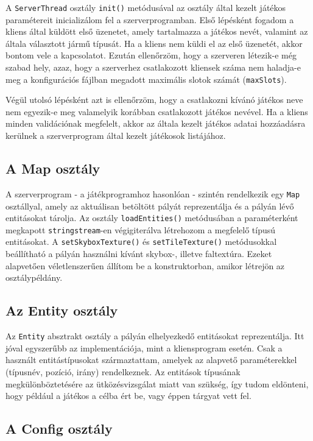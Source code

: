 A \verb|ServerThread| osztály \verb|init()| metódusával az osztály által kezelt játékos paramétereit inicializálom fel a szerverprogramban. Első lépésként fogadom a kliens által küldött első üzenetet, amely tartalmazza a játékos nevét, valamint az általa választott jármű típusát. Ha a kliens nem küldi el az első üzenetét, akkor bontom vele a kapcsolatot. Ezután ellenőrzöm, hogy a szerveren létezik-e még szabad hely, azaz, hogy a szerverhez csatlakozott kliensek száma nem haladja-e meg a konfigurációs fájlban megadott maximális slotok számát (\verb|maxSlots|).

Végül utolsó lépésként azt is ellenőrzöm, hogy a csatlakozni kívánó játékos neve nem egyezik-e meg valamelyik korábban csatlakozott játékos nevével. Ha a kliens minden validációnak megfelelt, akkor az általa kezelt játékos adatai hozzáadásra kerülnek a szerverprogram által kezelt játékosok listájához.

\subsection{A Map osztály}

A szerverprogram - a játékprogramhoz hasonlóan - szintén rendelkezik egy \verb|Map| osztállyal, amely az aktuálisan betöltött pályát reprezentálja és a pályán lévő entitásokat tárolja. Az osztály \verb|loadEntities()| metódusában a paraméterként megkapott \verb|stringstream|-en végigiterálva létrehozom a megfelelő típusú entitásokat. A \verb|setSkyboxTexture()| és \verb|setTileTexture()| metódusokkal beállítható a pályán használni kívánt skybox-, illetve faltextúra. Ezeket alapvetően véletlenszerűen állítom be a konstruktorban, amikor létrejön az osztálypéldány.

\subsection{Az Entity osztály}

Az \verb|Entity| absztrakt osztály a pályán elhelyezkedő entitásokat reprezentálja. Itt jóval egyszerűbb az implementációja, mint a kliensprogram esetén. Csak a használt entitástípusokat származtattam, amelyek az alapvető paraméterekkel (típusnév, pozíció, irány) rendelkeznek. Az entitások típusának megkülönböztetésére az ütközésvizsgálat miatt van szükség, így tudom eldönteni, hogy például a játékos a célba ért be, vagy éppen tárgyat vett fel.

\subsection{A Config osztály}

